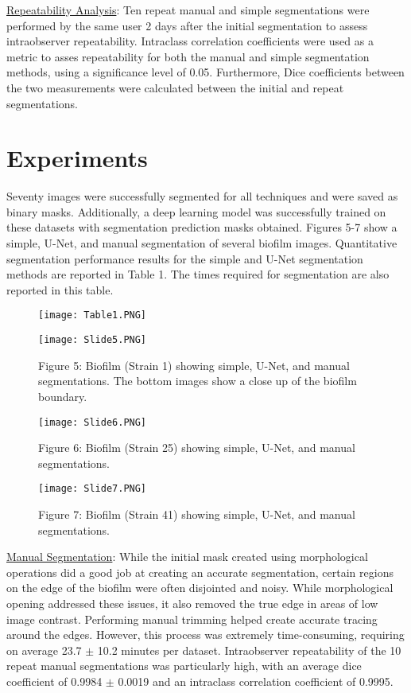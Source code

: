 \documentclass[conference]{IEEEtran}
\begin{document}
\ul{Repeatability Analysis}: Ten repeat manual and simple segmentations were performed by the same user 2 days after the initial segmentation to assess intraobserver repeatability. Intraclass correlation coefficients were used as a metric to asses repeatability for both the manual and simple segmentation methods, using a significance level of 0.05. Furthermore, Dice coefficients between the two measurements were calculated between the initial and repeat segmentations. 


\section{Experiments}
Seventy images were successfully segmented for all techniques and were saved as binary masks. Additionally, a deep learning model was successfully trained on these datasets with segmentation prediction masks obtained. Figures 5-7 show a simple, U-Net, and manual segmentation of several biofilm images. Quantitative segmentation performance results for the simple and U-Net segmentation methods are reported in Table 1. The times required for segmentation are also reported in this table.

\begin{figure}[h]
\centering
\texttt{[image: Table1.PNG]}
\label{Table1}
\end{figure}

\begin{figure}[h]
\centering
\texttt{[image: Slide5.PNG]}
\caption{Figure 5: Biofilm (Strain 1) showing simple, U-Net, and manual segmentations. The bottom images show a close up of the biofilm boundary.}
\label{figName5}
\end{figure}

\begin{figure}[h]
\centering
\texttt{[image: Slide6.PNG]}
\caption{Figure 6: Biofilm (Strain 25) showing simple, U-Net, and manual segmentations.}
\label{figName6}
\end{figure}

\begin{figure}[h]
\centering
\texttt{[image: Slide7.PNG]}
\caption{Figure 7: Biofilm (Strain 41) showing simple, U-Net, and manual segmentations.}
\label{figName7}
\end{figure}

\ul{Manual Segmentation}: While the initial mask created using morphological operations did a good job at creating an accurate segmentation, certain regions on the edge of the biofilm were often disjointed and noisy. While morphological opening addressed these issues, it also removed the true edge in areas of low image contrast. Performing manual trimming helped create accurate tracing around the edges. However, this process was extremely time-consuming, requiring on average 23.7 $\pm$ 10.2 minutes per dataset. Intraobserver repeatability of the 10 repeat manual segmentations was particularly high, with an average dice coefficient of 0.9984 $\pm$ 0.0019 and an intraclass correlation coefficient of 0.9995.
\end{document}
